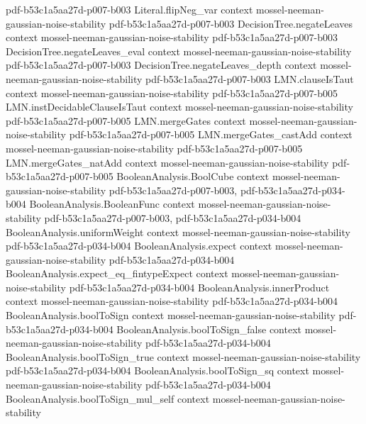 \begin{theorem}
  {pdf-b53c1a5aa27d-p007-b003}
\proofstep
  {Literal.flipNeg_var}
  {context}
  {mossel-neeman-gaussian-noise-stability}
  {pdf-b53c1a5aa27d-p007-b003}
\proofstep
  {DecisionTree.negateLeaves}
  {context}
  {mossel-neeman-gaussian-noise-stability}
  {pdf-b53c1a5aa27d-p007-b003}
\proofstep
  {DecisionTree.negateLeaves_eval}
  {context}
  {mossel-neeman-gaussian-noise-stability}
  {pdf-b53c1a5aa27d-p007-b003}
\proofstep
  {DecisionTree.negateLeaves_depth}
  {context}
  {mossel-neeman-gaussian-noise-stability}
  {pdf-b53c1a5aa27d-p007-b003}
\proofstep
  {LMN.clauseIsTaut}
  {context}
  {mossel-neeman-gaussian-noise-stability}
  {pdf-b53c1a5aa27d-p007-b005}
\proofstep
  {LMN.instDecidableClauseIsTaut}
  {context}
  {mossel-neeman-gaussian-noise-stability}
  {pdf-b53c1a5aa27d-p007-b005}
\proofstep
  {LMN.mergeGates}
  {context}
  {mossel-neeman-gaussian-noise-stability}
  {pdf-b53c1a5aa27d-p007-b005}
\proofstep
  {LMN.mergeGates_castAdd}
  {context}
  {mossel-neeman-gaussian-noise-stability}
  {pdf-b53c1a5aa27d-p007-b005}
\proofstep
  {LMN.mergeGates_natAdd}
  {context}
  {mossel-neeman-gaussian-noise-stability}
  {pdf-b53c1a5aa27d-p007-b005}
\proofstep
  {BooleanAnalysis.BoolCube}
  {context}
  {mossel-neeman-gaussian-noise-stability}
  {pdf-b53c1a5aa27d-p007-b003,
    pdf-b53c1a5aa27d-p034-b004}
\proofstep
  {BooleanAnalysis.BooleanFunc}
  {context}
  {mossel-neeman-gaussian-noise-stability}
  {pdf-b53c1a5aa27d-p007-b003,
    pdf-b53c1a5aa27d-p034-b004}
\proofstep
  {BooleanAnalysis.uniformWeight}
  {context}
  {mossel-neeman-gaussian-noise-stability}
  {pdf-b53c1a5aa27d-p034-b004}
\proofstep
  {BooleanAnalysis.expect}
  {context}
  {mossel-neeman-gaussian-noise-stability}
  {pdf-b53c1a5aa27d-p034-b004}
\proofstep
  {BooleanAnalysis.expect_eq_fintypeExpect}
  {context}
  {mossel-neeman-gaussian-noise-stability}
  {pdf-b53c1a5aa27d-p034-b004}
\proofstep
  {BooleanAnalysis.innerProduct}
  {context}
  {mossel-neeman-gaussian-noise-stability}
  {pdf-b53c1a5aa27d-p034-b004}
\proofstep
  {BooleanAnalysis.boolToSign}
  {context}
  {mossel-neeman-gaussian-noise-stability}
  {pdf-b53c1a5aa27d-p034-b004}
\proofstep
  {BooleanAnalysis.boolToSign_false}
  {context}
  {mossel-neeman-gaussian-noise-stability}
  {pdf-b53c1a5aa27d-p034-b004}
\proofstep
  {BooleanAnalysis.boolToSign_true}
  {context}
  {mossel-neeman-gaussian-noise-stability}
  {pdf-b53c1a5aa27d-p034-b004}
\proofstep
  {BooleanAnalysis.boolToSign_sq}
  {context}
  {mossel-neeman-gaussian-noise-stability}
  {pdf-b53c1a5aa27d-p034-b004}
\proofstep
  {BooleanAnalysis.boolToSign_mul_self}
  {context}
  {mossel-neeman-gaussian-noise-stability}

\end{theorem}
